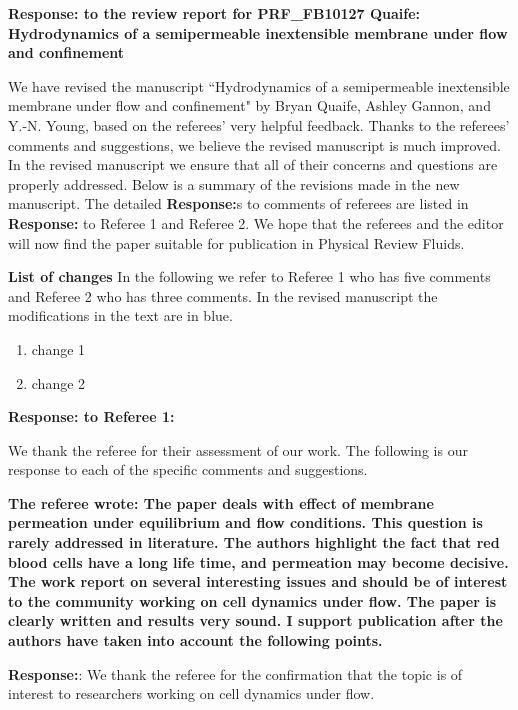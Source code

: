 \documentclass[12pt]{article}
\begin{document}
{\large \bf {\bf Response:} to the review report for PRF\_FB10127 Quaife: Hydrodynamics of a semipermeable inextensible membrane under flow and confinement}
\vspace{0.5cm}

We have revised the manuscript ``Hydrodynamics of a semipermeable inextensible membrane under flow and confinement"  
by Bryan Quaife, Ashley Gannon, and Y.-N. Young, 
based on 
the referees' very helpful feedback.  
Thanks to the referees' comments
and suggestions, we believe the revised manuscript is much
improved. 
In the revised manuscript we ensure that
all of their concerns and questions are properly addressed.
Below is a summary of the revisions made in the new manuscript.
The detailed {\bf Response:}s to comments of referees are listed in 
{\bf Response:} to Referee 1 and Referee 2.
We hope that the referees and the
editor will now find the paper suitable for publication in 
Physical Review Fluids.

\vspace{0.5cm}
{\large \bf List of changes}
In the following we refer to Referee 1 who has five comments and Referee
2 who has three comments. In the revised manuscript the modifications in
the text are in blue.

\begin{enumerate}
\item{change 1}
\item{change 2}
\end{enumerate}

\newpage
\vspace{0.5cm}
{\large \bf {\bf Response:} to Referee 1:}
\vspace{0.5cm}

We thank the referee for their assessment of our work. The following is
our response to each of the specific comments and suggestions.


{\bf The referee wrote:
The paper deals with effect of membrane permeation under equilibrium
and flow conditions. This question is rarely addressed in literature.
The authors highlight the fact that red blood cells have a long life
time, and permeation may become decisive. The work report on several
interesting issues and should be of interest to the community working
on cell dynamics under flow. The paper is clearly written and results
very sound. I support publication after the authors have taken into
account the following points.
}

\noindent
{\bf Response:}: We thank the referee for the confirmation that the topic is of interest to researchers working on cell dynamics under flow.
\end{document}
